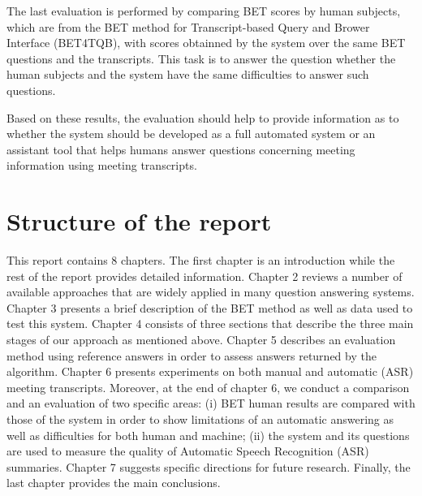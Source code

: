 The last evaluation is performed by comparing BET scores by human subjects, which are from the BET method for Transcript-based Query and Brower Interface (BET4TQB)\cite{popescubelis2007otm}, with scores obtainned by the system over the same BET questions and the transcripts. This task is to answer the question whether the human subjects and the system have the same difficulties to answer such questions.   

Based on these results, the evaluation should help to provide information as to whether the system should be developed as a full automated system or an assistant tool that helps humans answer questions concerning meeting information using meeting transcripts.

\section{Structure of the report}
This report contains 8 chapters. The first chapter is an introduction while the rest of the report provides detailed information. Chapter 2 reviews a number of available approaches that are widely applied in many question answering systems. Chapter 3 presents a brief description of the BET method as well as data used to test this system. Chapter 4 consists of three sections that describe the three main stages of our approach as mentioned above. Chapter 5 describes an evaluation method using reference answers in order to assess answers returned by the algorithm. Chapter 6 presents experiments on both manual and automatic (ASR) meeting transcripts. Moreover, at the end of chapter 6, we conduct a comparison and an evaluation of two specific areas: (i) BET human results are compared with those of the system in order to show limitations of an automatic answering as well as difficulties for both human and machine; (ii) the system and its questions are used to measure the quality of Automatic Speech Recognition (ASR) summaries. Chapter 7 suggests specific directions for future research. Finally, the last chapter provides the main conclusions.

